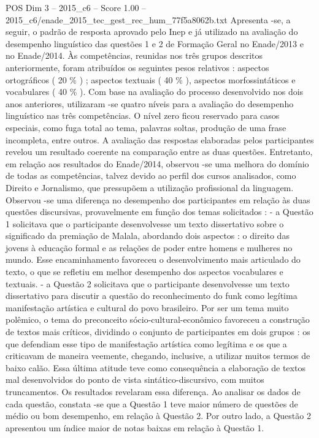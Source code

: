 \begin{textsample}{POS Dim 3 – 2015\_c6 – Score 1.00 – 2015\_c6/enade\_2015\_tec\_gest\_rec\_hum\_77f5a8062b.txt}
Apresenta -se, a seguir, o padrão de resposta aprovado pelo Inep e já utilizado na avaliação do desempenho linguístico das questões 1 e 2 de Formação Geral no Enade/2013 e no Enade/2014.
Às competências, reunidas nos três grupos descritos anteriormente, foram atribuídos os seguintes pesos relativos : aspectos ortográficos ( 20 \% ) ; aspectos textuais ( 40 \% ), aspectos morfossintáticos e vocabulares ( 40 \% ).
Com base na avaliação do processo desenvolvido nos dois anos anteriores, utilizaram -se quatro níveis para a avaliação do desempenho linguístico nas três competências.
O nível zero ficou reservado para casos especiais, como fuga total ao tema, palavras soltas, produção de uma frase incompleta, entre outros.
A avaliação das respostas elaboradas pelos participantes revelou um resultado coerente na comparação entre as duas questões.
Entretanto, em relação aos resultados do Enade/2014, observou -se uma melhora do domínio de todas as competências, talvez devido ao perfil dos cursos analisados, como Direito e Jornalismo, que pressupõem a utilização profissional da linguagem.
Observou -se uma diferença no desempenho dos participantes em relação às duas questões discursivas, provavelmente em função dos temas solicitados : - a Questão 1 solicitava que o participante desenvolvesse um texto dissertativo sobre o significado da premiação de Malala, abordando dois aspectos : o direito das jovens à educação formal e as relações de poder entre homens e mulheres no mundo.
Esse encaminhamento favoreceu o desenvolvimento mais articulado do texto, o que se refletiu em melhor desempenho dos aspectos vocabulares e textuais. - a Questão 2 solicitava que o participante desenvolvesse um texto dissertativo para discutir a questão do reconhecimento do funk como legítima manifestação artística e cultural do povo brasileiro.
Por ser um tema muito polêmico, o tema do preconceito sócio-cultural-econômico favoreceu a construção de textos mais críticos, dividindo o conjunto de participantes em dois grupos : os que defendiam esse tipo de manifestação artística como legítima e os que a criticavam de maneira veemente, chegando, inclusive, a utilizar muitos termos de baixo calão.
Essa última atitude teve como consequência a elaboração de textos mal desenvolvidos do ponto de vista sintático-discursivo, com muitos truncamentos.
Os resultados revelaram essa diferença.
Ao analisar os dados de cada questão, constata -se que a Questão 1 teve maior número de questões de médio ou bom desempenho, em relação à Questão 2.
Por outro lado, a Questão 2 apresentou um índice maior de notas baixas em relação à Questão 1.

\end{textsample}
